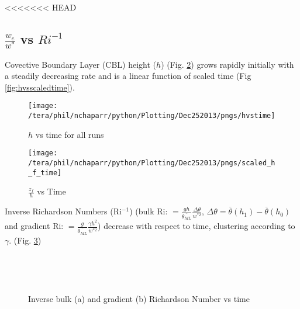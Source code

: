 <<<<<<< HEAD

\subsection{$\frac{w_{e}}{w^{*}}$ vs $Ri^{-1}$}
\FloatBarrier
Covective Boundary Layer (CBL) height ($h$) (Fig. \ref{fig:hvstime}) grows rapidly initially with a steadily decreasing rate
and is a linear function of scaled time (Fig \ref{fig:hvsscaledtime}).\\
  
\begin{figure}[htbp]
    \centering
    \texttt{[image: /tera/phil/nchaparr/python/Plotting/Dec252013/pngs/hvstime]}
    \caption{$h$ vs time for all runs}
    \label{fig:hvstime}   %
\end{figure}


\begin{figure}[htbp]
    \centering
    \texttt{[image: /tera/phil/nchaparr/python/Plotting/Dec252013/pngs/scaled\_h\_f\_time]}
    \caption{$\frac{z_{f}}{h}$ vs Time}
    \label{fig:hvstime}   %
\end{figure}





Inverse Richardson Numbers (\acs{Ri}$^{-1}$) (bulk \acs{Ri}: $=\frac{gh}{\overline{\theta_{ML}}} \frac{\Delta \theta}{w^{*2}}$, $\Delta \theta = \overline{\theta}(h_{1})-\overline{\theta}(h_{0})$ 
and gradient \acs{Ri}: $=\frac{g}{\overline{\theta_{ML}}} \frac{\gamma h^{2} }{w^{*2}}$) decrease with respect to time, 
clustering according to $\gamma$. (Fig. \ref{fig:invristime})\\

\begin{figure}[htbp]

\begin{minipage}[b]{0.5\linewidth}
         
        \\
        \end{minipage}             
\quad
\begin{minipage}[b]{0.5\linewidth}
        \\
       
       \end{minipage}
        \caption{Inverse bulk (a)  and gradient (b) Richardson Number vs time}
        \label{fig:invristime}
\end{figure}

